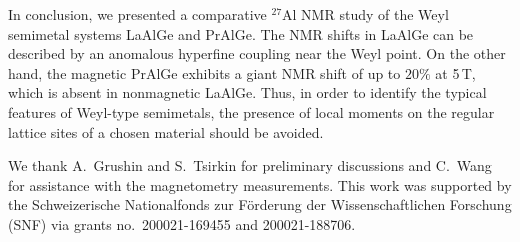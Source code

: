 \documentclass[aps,prb,a4paper,10pt,twocolumn,showpacs,floatfix,superscriptaddress,preprintnumbers,longbibliography]{revtex4-2}
\begin{document}



In conclusion, we presented a comparative $^{27}$Al NMR study of the
Weyl semimetal systems LaAlGe and PrAlGe. The NMR shifts in
LaAlGe can be described by an anomalous hyperfine coupling near the Weyl
point. On the other hand, the magnetic PrAlGe exhibits a giant NMR shift
of up to $20\%$ at 5\,T, which is absent in nonmagnetic LaAlGe.
Thus, in order to identify the typical features of Weyl-type semimetals,
the presence of local moments on the regular lattice sites of a chosen
material should be avoided.

%






%
We thank A.\ Grushin and S.\ Tsirkin for preliminary discussions
and C.\ Wang for assistance with the magnetometry measurements.
This work was supported by the 
Schwei\-ze\-rische Na\-ti\-o\-nal\-fonds zur F\"{o}r\-de\-rung der 
Wis\-sen\-schaft\-lich\-en For\-schung (SNF) via grants no.\ 
200021-169455 and 200021-188706.
\end{document}
